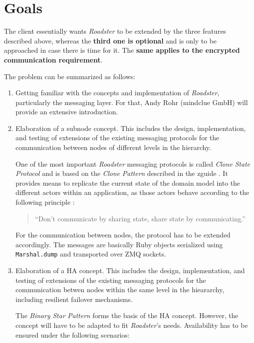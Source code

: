 \documentclass[a4paper]{article}
\newcommand{\rb}[1]{\lstinline[style=customruby]{#1}} %
\begin{document}
\section{Goals}
The client essentially wants \emph{Roadster} to be extended by the three
features described above, whereas the \textbf{third one is optional} and is
only to be approached in case there is time for it. The \textbf{same applies
to the encrypted communication requirement}.

The problem can be summarized as follows:

\begin{enumerate}
	\item Getting familiar with the concepts and implementation of
		\emph{Roadster}, particularly the messaging layer. For that,
		Andy Rohr (mindclue GmbH) will provide an extensive
		introduction.

	\item Elaboration of a subnode concept. This includes the design,
		implementation, and testing of extensions of the existing
		messaging protocols for the communication between nodes of
		different levels in the hierarchy.

		One of the most important \emph{Roadster} messaging protocols
		is called \emph{Clone State Protocol} and is based on the
		\emph{Clone Pattern} described in the zguide
		\cite{zguide:clone-pattern}. It provides means to replicate the
		current state of the domain model into the different actors
		within an application, as those actors behave according to the
		following principle \cite{golang:sharemem}:

		\begin{quote}
		``Don't communicate by sharing state, share state by communicating.''
		\end{quote}

		For the communication between nodes, the protocol has to be
		extended accordingly. The messages are basically Ruby objects
		serialized using \rb{Marshal.dump} and transported over ZMQ
		sockets.

	\item Elaboration of a HA concept. This includes the design,
		implementation, and testing of extensions of the existing
		messaging protocols for the communication betwen nodes within
		the same level in the hieararchy, including resilient failover
		mechanisms.

		The \emph{Binary Star Pattern}
		\cite{zguide:binary-star}\cite{zguide:adding-binary-star} forms
		the basis of the HA concept. However, the concept will have to
		be adapted to fit \emph{Roadster}'s needs. Availability has to
		be ensured under the following scenarios:


\end{enumerate}
\end{document}
